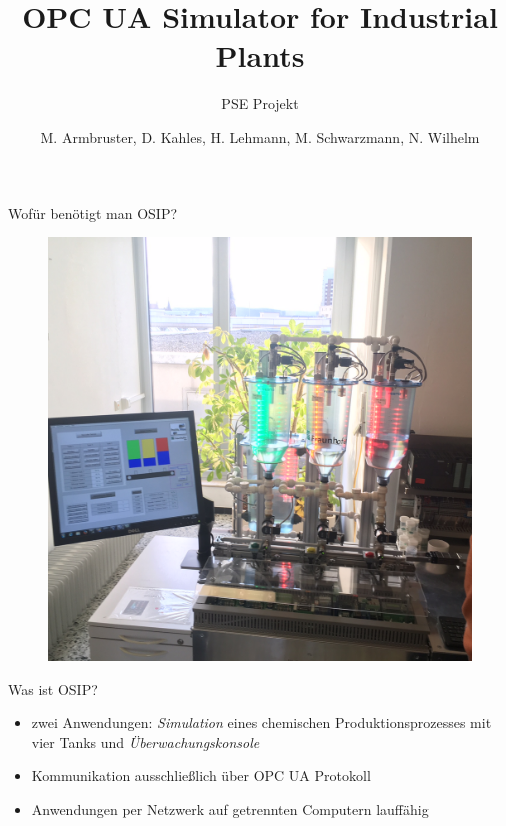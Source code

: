 \documentclass[22pt]{beamer}
\title[OSIP]{OPC UA Simulator for Industrial Plants}
\subtitle{PSE Projekt}
\author{M. Armbruster, D. Kahles, H. Lehmann, M. Schwarzmann, N. Wilhelm}
\begin{document}

\begin{frame}
\titlepage
\end{frame}

\begin{frame}{Wofür benötigt man OSIP?}
\begin{figure}[ht!]
\centering
\includegraphics[height=\textheight,width=\textwidth,keepaspectratio=true]{Demoanlage_IOSB.jpg}
\end{figure}
\end{frame}

\begin{frame}{Was ist OSIP?}
\begin{itemize}[<+->]
 \item zwei Anwendungen: \emph{Simulation} eines chemischen Produktionsprozesses mit vier Tanks und \emph{Überwachungskonsole}
 \item Kommunikation ausschließlich über OPC UA Protokoll
 \item Anwendungen per Netzwerk auf getrennten Computern lauffähig
\end{itemize}
\end{frame}
\end{document}
